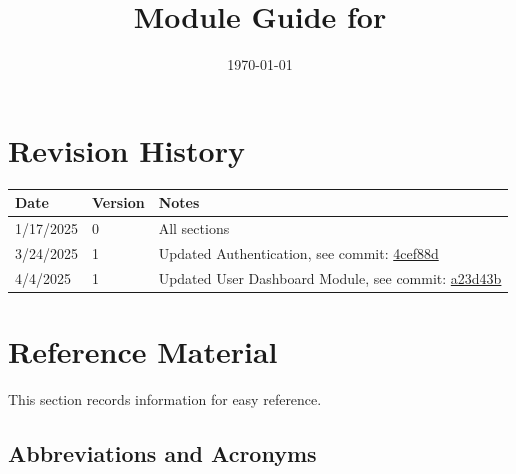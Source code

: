 \documentclass[12pt, titlepage]{article}
\begin{document}
\title{Module Guide for \progname{}} 
\author{\authname}
\date{\today}

\maketitle


\section{Revision History}

\begin{tabularx}{\textwidth}{p{3cm}p{2cm}X}
\toprule {\bf Date} & {\bf Version} & {\bf Notes}\\
\midrule
1/17/2025 & 0 & All sections\\
3/24/2025 & 1 & Updated Authentication, see commit: \href{https://github.com/ausbennett/mes-finance-platform/commit/4cef88de4d7c2a664fa8e2395804251c0a6baeb4}{4cef88d}\\
4/4/2025 & 1 & Updated User Dashboard Module, see commit: \href{https://github.com/ausbennett/mes-finance-platform/commit/a23d43b84b1426d0f6a8d13d3120043a0d8c54b3}{a23d43b}\\
\bottomrule
\end{tabularx}

\newpage

\section{Reference Material}

This section records information for easy reference.

\subsection{Abbreviations and Acronyms}

\renewcommand{\arraystretch}{1.2}
\end{document}
